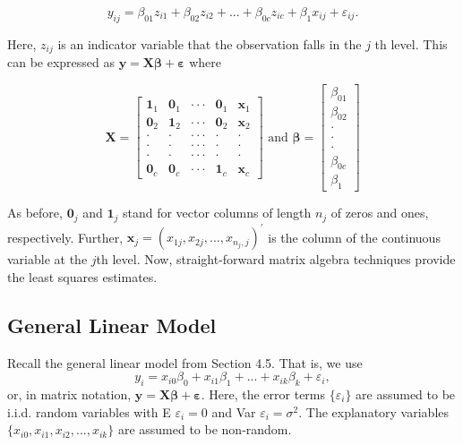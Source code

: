 \begin{center}
\[
y_{ij}=\beta_{01}z_{i1}+\beta_{02}z_{i2}+...+\beta
_{0c}z_{ic}+\beta_1x_{ij}+\varepsilon_{ij}.
\]
\end{center}

\noindent Here, $z_{ij}$ is an indicator variable that the observation falls in the $j$%
th level. This can be expressed as $\mathbf{y}=%
\mathbf{X \boldsymbol \beta + \boldsymbol \varepsilon}$ where

\begin{center}
\[
\mathbf{X}=%
\begin{bmatrix}
\mathbf{1}_1 & \mathbf{0}_1 & \cdot \cdot \cdot  & \mathbf{0}%
_1 & \mathbf{x}_1 \\
\mathbf{0}_2 & \mathbf{1}_2 & \cdot \cdot \cdot  & \mathbf{0}%
_2 & \mathbf{x}_2 \\
\cdot  & \cdot  & \cdot \cdot \cdot  & \cdot  & \cdot  \\
\cdot  & \cdot  & \cdot \cdot \cdot  & \cdot  & \cdot  \\
\cdot  & \cdot  & \cdot \cdot \cdot  & \cdot  & \cdot  \\
\mathbf{0}_{c} & \mathbf{0}_{c} & \cdot \cdot \cdot  & \mathbf{1}_c & \mathbf{x}_{c}%
\end{bmatrix}%
\text{ \ \ \ \ and \ \ \ }\boldsymbol \beta=%
\begin{bmatrix}
\beta_{01} \\
\beta_{02} \\
\cdot  \\
\cdot  \\
\cdot  \\
\beta_{0c} \\
\beta_1%
\end{bmatrix}
\]
\end{center}

\noindent As before, $\mathbf{0}_{j}$ and $\mathbf{1}_j$ stand for
vector columns of length $n_{j}$ of zeros and ones, respectively.
Further, $\mathbf{x}_{j}=(x_{1j},x_{2j},...,x_{n_{j},j})^{\prime }$
is the column of the continuous variable at the $j$th level. Now,
straight-forward matrix algebra techniques provide the least squares
estimates.

\subsection{General Linear Model}

Recall the general linear model from Section 4.5. That is, we use
\begin{equation*}
y_i=x_{i0}\beta_0+x_{i1}\beta_1+...+x_{ik}\beta _k+\varepsilon_i,
\end{equation*}
\noindent or, in matrix notation, $ \mathbf{y=X \boldsymbol \beta +
\boldsymbol \varepsilon.}$ Here, the error terms $\{\varepsilon_i\}$
are assumed to be i.i.d. random variables
with E $\varepsilon_i=0$ and Var $\varepsilon_i=\sigma ^{2}$. The explanatory variables $%
\{x_{i0},x_{i1},x_{i2},...,x_{ik}\}$ are assumed to be non-random.

